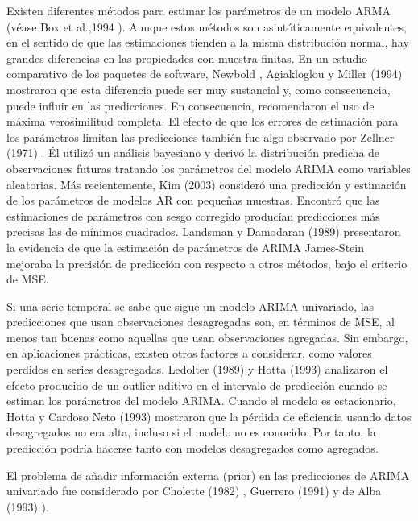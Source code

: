 \documentclass{llncs}
\begin{document}
Existen diferentes métodos para estimar los parámetros de un modelo ARMA (véase Box et al.,1994 \cite{Box1994}). Aunque estos métodos son asintóticamente equivalentes, en el sentido de que las estimaciones tienden a la misma distribución normal, hay grandes diferencias en las propiedades con muestra finitas. En un estudio comparativo de los paquetes de software, Newbold , Agiakloglou y Miller (1994)  \cite{Newbold1994573}mostraron que esta diferencia puede ser muy sustancial y, como consecuencia, puede influir en las predicciones. En consecuencia, recomendaron el uso de máxima verosimilitud completa. El efecto de que los errores de estimación para los parámetros limitan las predicciones también fue algo observado por Zellner (1971) \cite{Zellner1971}. Él utilizó un análisis bayesiano y derivó la distribución predicha de observaciones futuras tratando los parámetros del modelo ARIMA como variables aleatorias. Más recientemente,  Kim (2003) \cite{Kim2003493} consideró una predicción y estimación de los parámetros de modelos AR con pequeñas muestras. Encontró que las estimaciones de parámetros con sesgo corregido producían predicciones más precisas las de mínimos cuadrados. Landsman y Damodaran (1989) \cite{Landsman1989491} presentaron la evidencia de que la estimación de parámetros de ARIMA James-Stein mejoraba la precisión de predicción con respecto a otros métodos, bajo el criterio de MSE.

Si una serie temporal se sabe que sigue un modelo ARIMA univariado, las predicciones que usan observaciones desagregadas son, en términos de MSE, al menos tan buenas como aquellas que usan observaciones agregadas. Sin embargo, en aplicaciones prácticas, existen otros factores a considerar, como valores perdidos en series desagregadas. Ledolter (1989) \cite{Ledolter1989231} y Hotta (1993) \cite{Hotta1993261} analizaron el efecto producido de un outlier aditivo en el intervalo de predicción cuando se estiman los parámetros del modelo ARIMA. Cuando el modelo es estacionario, Hotta y Cardoso Neto (1993) mostraron que la pérdida de eficiencia usando datos desagregados no era alta, incluso si el modelo no es conocido. Por tanto, la predicción podría hacerse tanto con modelos desagregados como agregados.

El problema de añadir información externa (prior) en las predicciones de ARIMA univariado fue considerado por Cholette (1982) \cite{Cholette1982375}, Guerrero (1991) \cite{Guerrero1991339} y de Alba (1993) \cite{deAlba199395}).
\end{document}
